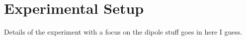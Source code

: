 \chapter{Experimental Setup}

Details of the experiment with a focus on the dipole stuff goes in here I guess.

